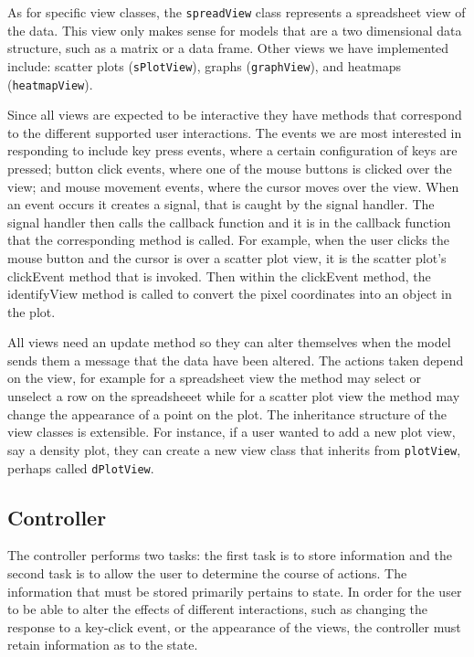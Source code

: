 \documentclass{article}[11pt]
\newcommand{\Rfunction}[1]{{\textsf{#1}}}
\newcommand{\Rclass}[1]{\texttt{#1}}
\begin{document}
As for specific view classes, the \Rclass{spreadView} class represents
a spreadsheet view of the data.  This view only makes sense for models
that are a two dimensional data structure, such as a matrix or a data
frame. Other views we have implemented include: scatter plots
(\Rclass{sPlotView}), graphs (\Rclass{graphView}), and heatmaps
(\Rclass{heatmapView}).

Since all views are expected to be interactive they have methods that
correspond to the different supported user interactions.  The events
we are most interested in responding to include key press events,
where a certain configuration of keys are pressed; button click
events, where one of the mouse buttons is clicked over the view; and
mouse movement events, where the cursor moves over the view.  When an
event occurs it creates a signal, that is caught by the signal
handler.  The signal handler then calls the callback function and it
is in the callback function that the corresponding method is called.
For example, when the user clicks the mouse button and the cursor is
over a scatter plot view, it is the scatter plot's
\Rfunction{clickEvent} method that is invoked.  Then within the
\Rfunction{clickEvent} method, the \Rfunction{identifyView} method is called
to convert the pixel coordinates into an object in the plot.

All views need an update method so they can alter themselves when the
model sends them a message that the data have been altered. The
actions taken depend on the view, for example for a spreadsheet view
the method may select or unselect a row on the spreadsheeet while for
a scatter plot view the method may change the appearance of a point on
the plot.  The inheritance structure of the view classes is
extensible.  For instance, if a user wanted to add a new plot view,
say a density plot, they can create a new view class that inherits
from \Rclass{plotView}, perhaps called \Rclass{dPlotView}.

\subsection{Controller}
\label{Ssec:OneCont}

The controller performs two tasks: the first task is to store
information and the second task is to allow the user to determine the
course of actions.  The information that must be stored primarily
pertains to state. In order for the user to be able to alter the
effects of different interactions, such as changing the response to a
key-click event, or the appearance of the views, the controller must
retain information as to the state.
\end{document}
